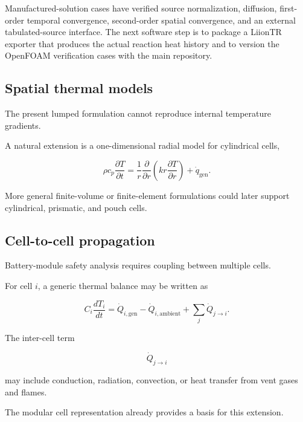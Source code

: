 Manufactured-solution cases have verified source normalization, diffusion,
first-order temporal convergence, second-order spatial convergence, and an
external tabulated-source interface. The next software step is to package a
LiionTR exporter that produces the actual reaction heat history and to version
the OpenFOAM verification cases with the main repository.

\subsection{Spatial thermal models}

The present lumped formulation cannot reproduce internal temperature
gradients.

A natural extension is a one-dimensional radial model for cylindrical
cells,

\begin{equation}
    \rho c_p
    \frac{\partial T}{\partial t}
    =
    \frac{1}{r}
    \frac{\partial}{\partial r}
    \left(
        k r
        \frac{\partial T}{\partial r}
    \right)
    +
    \dot{q}_{\mathrm{gen}}.
\end{equation}

More general finite-volume or finite-element formulations could later
support cylindrical, prismatic, and pouch cells.


\subsection{Cell-to-cell propagation}

Battery-module safety analysis requires coupling between multiple cells.

For cell $i$, a generic thermal balance may be written as

\begin{equation}
    C_i
    \frac{dT_i}{dt}
    =
    \dot{Q}_{i,\mathrm{gen}}
    -
    \dot{Q}_{i,\mathrm{ambient}}
    +
    \sum_j
    \dot{Q}_{j\rightarrow i}.
\end{equation}

The inter-cell term

\begin{equation}
    \dot{Q}_{j\rightarrow i}
\end{equation}

may include conduction, radiation, convection, or heat transfer from
vent gases and flames.

The modular cell representation already provides a basis for this
extension.


